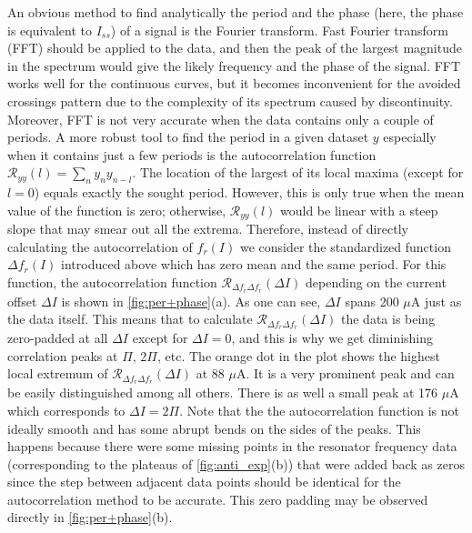 \documentclass[%
 aip,
 draft,
 amsmath,amssymb,
 reprint,%
]{revtex4-1}
\begin{document}
An obvious method to find analytically the period and the phase (here, the phase is equivalent to $I_{ss}$) of a signal is the Fourier transform. Fast Fourier transform (FFT) should be applied to the data, and then the peak of the largest magnitude in the spectrum would give the likely frequency and the phase of the signal. FFT works well for the continuous curves, but it becomes inconvenient for the avoided crossings pattern due to the complexity of its spectrum caused by discontinuity. Moreover, FFT is not very accurate when the data contains only a couple of periods. A more robust tool to find the period in a given dataset $y$ especially when it contains just a few periods is the autocorrelation function $\mathcal{R}_{y y}(l) = \sum_n y_n y_{n-l}$. The location of the largest of its local maxima (except for $l=0$) equals exactly the sought period\cite{parthasarathy2006}. However, this is only true when the mean value of the function is zero; otherwise, $\mathcal{R}_{y y}(l)$ would be linear with a steep slope that may smear out all the extrema. Therefore, instead of directly calculating the autocorrelation of $f_r (I)$ we consider the standardized function $\Delta f_r (I)$ introduced above which has zero mean and the same period. For this function, the autocorrelation function $\mathcal{R}_{\Delta f_r \Delta f_r}(\Delta I)$ depending on the current offset $\Delta I$ is shown in \autoref{fig:per+phase}(a). As one can see, $\Delta I$ spans 200 $\mu$A just as the data itself. This means that to calculate $\mathcal{R}_{\Delta f_r \Delta f_r}(\Delta I)$ the data is being zero-padded at all $\Delta I$ except for $\Delta I = 0$, and this is why we get diminishing correlation peaks at $\Pi$, $2\Pi$, etc. The orange dot in the plot shows the highest local extremum of $\mathcal{R}_{\Delta f_r \Delta f_r}(\Delta I)$ at 88 $\mu$A. It is a very prominent peak and can be easily distinguished among all others. There is as well a small peak at 176 $\mu$A which corresponds to $\Delta I = 2\Pi$. Note that the the autocorrelation function is not ideally smooth and has some abrupt bends on the sides of the peaks. This happens because there were some missing points in the resonator frequency data (corresponding to the plateaus of \autoref{fig:anti_exp}(b)) that were added back as zeros since the step between adjacent data points should be identical for the autocorrelation method to be accurate. This zero padding may be observed directly in \autoref{fig:per+phase}(b).
\end{document}
